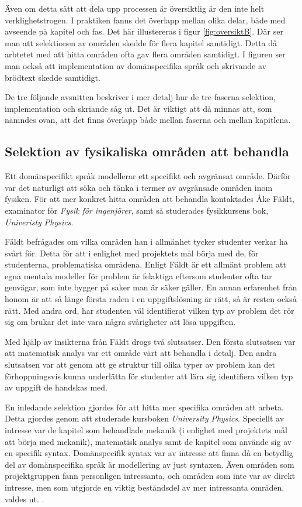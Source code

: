 \begin{binge}
Även om detta sätt att dela upp processen är översiktlig är den inte helt verklighetstrogen. I praktiken fanns det överlapp mellan olika delar, både med avseende på kapitel och fas. Det här illustereras i figur \ref{fig:oversiktB}. Där ser man att selektionen av områden skedde för flera kapitel samtidigt. Detta då arbtetet med att hitta områden ofta gav flera områden samtidigt. I figuren ser man också att implementation av domänspecifika språk och skrivande av brödtext skedde samtidigt.

De tre följande avsnitten beskriver i mer detalj hur de tre faserna selektion, implementation och skriande såg ut. Det är viktigt att då minnas att, som nämndes ovan, att det finns överlapp både mellan faserna och mellan kapitlena.

\subsection{Selektion av fysikaliska områden att behandla}
\label{sec:selektion}

Ett domänspecifikt språk modellerar ett specifikt och avgränsat område. Därför var det naturligt att söka och tänka i termer av avgränsade områden inom fysiken. För att mer konkret hitta områden att behandla kontaktades Åke Fäldt, examinator för \textit{Fysik för ingenjörer}, samt så studerades fysikkursens bok, \textit{Univeristy Physics}.

Fäldt befrågades om vilka områden han i allmänhet tycker studenter verkar ha svårt för. Detta för att i enlighet med projektets mål börja med de, för studenterna, problematiska områdena. Enligt Fäldt är ett allmänt problem att egna mentala modeller för problem är felaktiga eftersom studenter ofta tar genvägar, som inte bygger på saker man är säker gäller. En annan erfarenhet från honom är att så länge första raden i en uppgiftslösning är rätt, så är resten också rätt. Med andra ord, har studenten väl identifierat vilken typ av problem det rör sig om brukar det inte vara några svårigheter att lösa uppgiften.

Med hjälp av insikterna från Fäldt drogs två slutsatser. Den första slutsatsen var att matematisk analys var ett område värt att behandla i detalj. Den andra slutsatsen var att genom att ge struktur till olika typer av problem kan det förhoppningsvis kunna underlätta för studenter att lära sig identifiera vilken typ av uppgift de handskas med.

En inledande selektion gjordes för att hitta mer specifika områden att arbeta. Detta gjordes genom att studerade kursboken \textit{University Physics}. Speciellt av intresse var de kapitel som behandlade mekanik (i enlighet med projektets mål att börja med mekanik), matematisk analys samt de kapitel som använde sig av en specifik syntax. Domänspecifik syntax var av intresse att finna då en betydlig del av domänspecifika språk är modellering av just syntaxen. Även områden som projektgruppen fann personligen intressanta, och områden som inte var av direkt intresse, men som utgjorde en viktig beståndsdel av mer intressanta områden, valdes ut. .


\end{binge}
